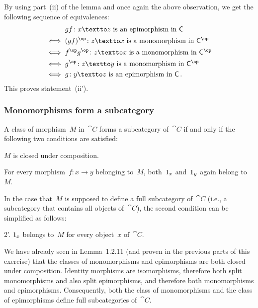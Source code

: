 By using part~(ii) of the lemma and once again the above observation, we get the following sequence of equivalences:
\begin{align*}
	{}&
	\text{$gf \colon x \textto z$ is an epimorphism in~$\cat{C}$}
	\\
	\iff{}&
	\text{$(gf)^{\op} \colon z \textto x$ is a monomorphism in~$\cat{C}^{\op}$}
	\\
	\iff{}&
	\text{$f^{\op} g^{\op} \colon z \textto x$ is a monomorphism in~$\cat{C}^{\op}$}
	\\
	\iff{}&
	\text{$g^{\op} \colon z \textto y$ is a monomorphism in~$\cat{C}^{\op}$}
	\\
	\iff{}&
	\text{$g \colon y \textto z$ is an epimorphism in~$\cat{C}$} \,.
\end{align*}
This proves statement~(ii').



\subsubsection*{Monomorphisms form a subcategory}

A class of morphism~$M$ in~$\cat{C}$ forms a subcategory of~$\cat{C}$ if and only if the following two conditions are satisfied:
\begin{enumerate*}

	\item
		$M$ is closed under composition.

	\item
		For every morphism~$f \colon x \to y$ belonging to~$M$, both~$1_x$ and~$1_y$ again belong to~$M$.

\end{enumerate*}
In the case  that~$M$ is supposed to define a full subcategory of~$\cat{C}$ (i.e., a subcategory that contains all objects of~$\cat{C}$), the second condition can be simplified as follows:
\begin{enumerate*}

	\item[2’.]
		$1_x$ belongs to~$M$ for every object~$x$ of~$\cat{C}$.

\end{enumerate*}

We have already seen in Lemma~1.2.11 (and proven in the previous parts of this exercise) that the classes of monomorphisms and epimorphisms are both closed under composition.
Identity morphisms are isomorphisms, therefore both split monomorphisms and also split epimorphisms, and therefore both monomorphisms and epimorphisms.
Consequently, both the class of monomorphisms and the class of epimorphisms define full subcategories of~$\cat{C}$.
